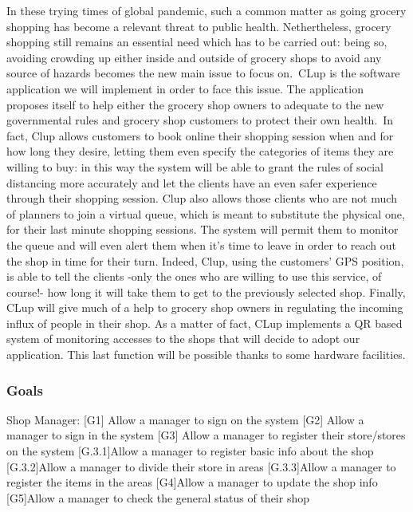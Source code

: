 In these trying times of global pandemic, such a common matter as going grocery shopping has become a relevant threat to public health. 
Nethertheless, grocery shopping still remains an essential need which has to be carried out: being so, avoiding crowding up either inside and outside of grocery shops to avoid any source of hazards becomes the new main issue to focus on.\ 
CLup is the software application we will implement in order to face this issue.
The application proposes itself to help either the grocery shop owners to adequate to the new governmental rules and grocery shop customers to protect their own health.\ 
In fact, Clup allows customers to book online their shopping session when and for how long they desire, letting them even specify the categories of items they are willing to buy: in this way the system will be able to grant the rules of social distancing more accurately and let the clients have an even safer experience through their shopping session.
Clup also allows those clients who are not much of planners to join a virtual queue, which is meant to substitute the physical one, for their last minute shopping sessions. The system will permit them to monitor the queue and will even alert them when it’s time to leave in order to reach out the shop in time for their turn. 
Indeed, Clup, using the customers’ GPS position, is able to tell the clients -only the ones who are willing to use this service, of course!- how long it will take them to get to the previously selected shop.
Finally, CLup will give much of a help to grocery shop owners in regulating the incoming influx of people in their shop. As a matter of fact, CLup implements a QR based system of monitoring accesses to the shops that will decide to adopt our application. This last function will be possible thanks to some hardware facilities.

\subsubsection{Goals}
\label{subsect:goals}

Shop Manager:
[G1] Allow a manager to sign on the system
[G2] Allow a manager to sign in the system
[G3] Allow a manager to register their store/stores on the system
    [G.3.1]Allow a manager to register basic info about the shop
	[G.3.2]Allow a manager to divide their store in areas 
	[G.3.3]Allow a manager to register the items in the areas 
[G4]Allow a manager to update the shop info
[G5]Allow a manager to check the general status of their shop

